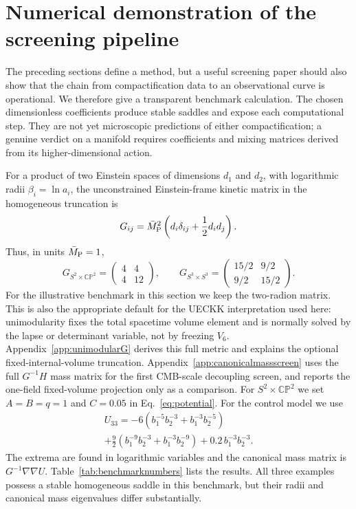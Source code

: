 \documentclass[aps,prd,twocolumn,superscriptaddress,nofootinbib,longbibliography]{revtex4-2}
\newcommand{\Mpl}{\bar M_{\rm P}}
\newcommand{\CP}{\mathbb{CP}}
\begin{document}
\section{Numerical demonstration of the screening pipeline}
\label{sec:numericaldemo}
The preceding sections define a method, but a useful screening paper should also show that the chain from compactification data to an observational curve is operational. We therefore give a transparent benchmark calculation. The chosen dimensionless coefficients produce stable saddles and expose each computational step. They are not yet microscopic predictions of either compactification; a genuine verdict on a manifold requires coefficients and mixing matrices derived from its higher-dimensional action.

For a product of two Einstein spaces of dimensions $d_1$ and $d_2$, with logarithmic radii $\beta_i=\ln a_i$, the unconstrained Einstein-frame kinetic matrix in the homogeneous truncation is
\begin{equation}
G_{ij}=\Mpl^2\left(d_i\delta_{ij}+\frac12 d_i d_j\right).
\label{eq:kineticmatrixbenchmark}
\end{equation}
Thus, in units $\Mpl=1$,
\begin{equation}
G_{S^2\times\CP^2}=\begin{pmatrix}4&4\\4&12\end{pmatrix},\qquad
G_{S^3\times S^3}=\begin{pmatrix}15/2&9/2\\9/2&15/2\end{pmatrix}.
\end{equation}
For the illustrative benchmark in this section we keep the two-radion matrix. This is also the appropriate default for the UECKK interpretation used here: unimodularity fixes the total spacetime volume element and is normally solved by the lapse or determinant variable, not by freezing $V_6$. Appendix~\ref{app:unimodularG} derives this full metric and explains the optional fixed-internal-volume truncation. Appendix~\ref{app:canonicalmassscreen} uses the full $G^{-1}H$ mass matrix for the first CMB-scale decoupling screen, and reports the one-field fixed-volume projection only as a comparison.
For $S^2\times\CP^2$ we set $A=B=q=1$ and $C=0.05$ in Eq.~\eqref{eq:potential}. For the control model we use
\begin{multline}
U_{33}=-6\left(b_1^{-5}b_2^{-3}+b_1^{-3}b_2^{-5}\right)\\
+\frac92\left(b_1^{-9}b_2^{-3}+b_1^{-3}b_2^{-9}\right)
+0.2\,b_1^{-3}b_2^{-3}.
\label{eq:s3benchmarkpotential}
\end{multline}
The extrema are found in logarithmic variables and the canonical mass matrix is $G^{-1}\nabla\nabla U$. Table~\ref{tab:benchmarknumbers} lists the results. All three examples possess a stable homogeneous saddle in this benchmark, but their radii and canonical mass eigenvalues differ substantially.
\end{document}
